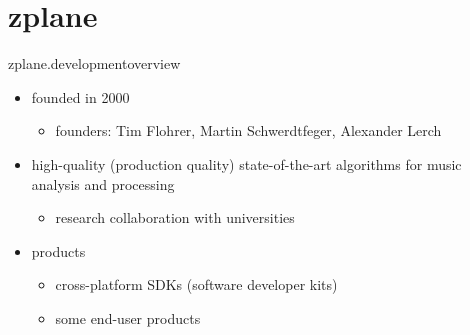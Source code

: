 				\section{zplane}
        \begin{frame}{zplane.development}{overview}
						\begin{itemize}
							\item	founded in 2000 
								\begin{itemize}
									\item founders: Tim Flohrer, Martin Schwerdtfeger, Alexander Lerch
								\end{itemize}
							\bigskip
							\item high-quality (production quality) state-of-the-art algorithms for music analysis and processing
								\begin{itemize}
									\item research collaboration with universities
								\end{itemize}
							\bigskip
							\item	products
							\begin{itemize}
								\item	cross-platform SDKs (software developer kits)
								\item some end-user products
							\end{itemize}
						\end{itemize}
        \end{frame}
				
